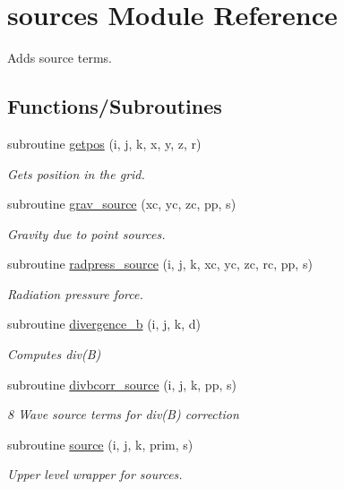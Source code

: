 \hypertarget{namespacesources}{}\section{sources Module Reference}
\label{namespacesources}


Adds source terms.  


\subsection*{Functions/\+Subroutines}
\begin{DoxyCompactItemize}
\item 
subroutine \hyperlink{namespacesources_a378a8116ae16db2efa853343f88156d3}{getpos} (i, j, k, x, y, z, r)
\begin{DoxyCompactList}\small\item\em Gets position in the grid. \end{DoxyCompactList}\item 
subroutine \hyperlink{namespacesources_aef9f6ca4bc770f0e768dbbba91b67415}{grav\+\_\+source} (xc, yc, zc, pp, s)
\begin{DoxyCompactList}\small\item\em Gravity due to point sources. \end{DoxyCompactList}\item 
subroutine \hyperlink{namespacesources_a36b548c9c578b74c5f439ffaec7d3a9a}{radpress\+\_\+source} (i, j, k, xc, yc, zc, rc, pp, s)
\begin{DoxyCompactList}\small\item\em Radiation pressure force. \end{DoxyCompactList}\item 
subroutine \hyperlink{namespacesources_a0478795277b4f25ec62d8e3e1f06611e}{divergence\+\_\+b} (i, j, k, d)
\begin{DoxyCompactList}\small\item\em Computes div(\+B) \end{DoxyCompactList}\item 
subroutine \hyperlink{namespacesources_a9c2d37de3b878eff7693a25d3dc3fe91}{divbcorr\+\_\+source} (i, j, k, pp, s)
\begin{DoxyCompactList}\small\item\em 8 Wave source terms for div(\+B) correction \end{DoxyCompactList}\item 
subroutine \hyperlink{namespacesources_a6a66dd1f8baf424ff64a30112f39c632}{source} (i, j, k, prim, s)
\begin{DoxyCompactList}\small\item\em Upper level wrapper for sources. \end{DoxyCompactList}\end{DoxyCompactItemize}


